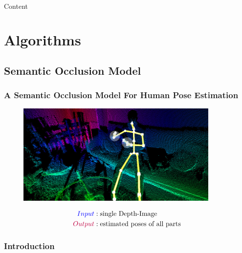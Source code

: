 \documentclass[xcolor=dvipsnames]{beamer}
\begin{document}
\begin{frame}{Content}
	\large
	\tableofcontents[subsubsectionstyle=hide]
\end{frame}

\section{Algorithms}
\subsection{Semantic Occlusion Model}
{
\begin{frame}
	\frametitle{A Semantic Occlusion Model For Human Pose Estimation}
	\vline
	\Large
	\begin{figure}
		\includegraphics[width=10cm]{img/example2.jpg}
	\end{figure}
	
	\begin{align*}
		\textcolor{blue}{Input}&:  \text{single Depth-Image} \\
		\textcolor{purple}{Output}&: \text{estimated poses of all parts}
	\end{align*}
\end{frame}}

\subsubsection{Introduction}
\end{document}

